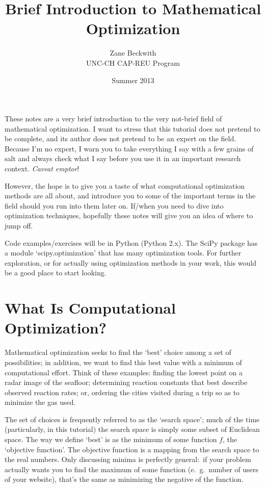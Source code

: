 \documentclass{article}
\begin{document}
\title{Brief Introduction to Mathematical Optimization}
\author{Zane Beckwith \\
UNC-CH CAP-REU Program}
\date{Summer 2013}
\maketitle

These notes are a very brief introduction to the very not-brief field of 
mathematical optimization. I want to stress that this tutorial does not
pretend to be complete, and its author does not pretend to be an expert
on the field. Because I'm no expert, I warn you to take everything I say
with a few grains of salt and always check what I say before you use
it in an important research context. \textit{Caveat emptor}!

However, the hope is to give you a taste of what computational
optimization methods are all about, and introduce you to some of the important
terms in the field should you run into them later on. If/when you need to dive
into optimization techniques, hopefully these notes will give you an idea of 
where to jump off.

Code examples/exercises will be in Python (Python 2.x). The SciPy package
has a module `scipy.optimization' that has many optimization tools. For further
exploration, or for actually using optimization methods in your work, 
this would be a good place to start looking.

\section*{What Is Computational Optimization?}
	Mathematical optimization seeks to find the `best' choice among
	a set of possibilities; in addition, we want to find this best
	value with a minimum of computational effort. 
	Think of these examples: finding the lowest point on a radar image
	of the seafloor; determining reaction constants that best describe
	observed reaction rates; or, ordering the cities visited during a trip
	so as to minimize the gas used.

	The set of choices is frequently referred
	to as the `search space'; much of the time (particularly, in this tutorial)
	the search space is simply some subset of Euclidean space.
	The way we define `best' is as the minimum of some function $f$,
	the `objective function'. The objective function is a mapping
	from the search space to the real numbers. Only discussing minima
	is perfectly general:\ if your problem actually
	wants you to find the maximum of some function (e.\ g.\ number of users
	of your website), that's the same as minimizing the negative of the function.
\end{document}
